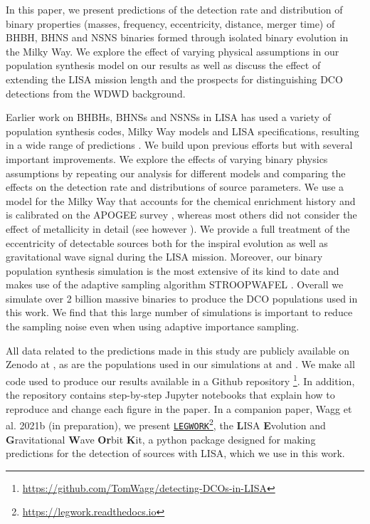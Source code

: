 In this paper, we present predictions of the detection rate and distribution of binary properties (masses, frequency, eccentricity, distance, merger time) of BHBH, BHNS and NSNS binaries formed through isolated binary evolution in the Milky Way. We explore the effect of varying physical assumptions in our population synthesis model on our results as well as discuss the effect of extending the LISA mission length and the prospects for distinguishing DCO detections from the WDWD background.

Earlier work on BHBHs, BHNSs and NSNSs in LISA has used a variety of population synthesis codes, Milky Way models and LISA specifications, resulting in a wide range of predictions \citep{Nelemans+2001,Liu+2009,Belczynski+2010,Liu+2014,Lamberts+2019,Lau+2020,Breivik+2020,Sesana+2020}. We build upon previous efforts but with several important improvements. We explore the effects of varying binary physics assumptions by repeating our analysis for \nModels{} different models and comparing the effects on the detection rate and distributions of source parameters. We use a model for the Milky Way that accounts for the chemical enrichment history and is calibrated on the APOGEE survey \citep{Majewski+2017,Frankel+2018}, whereas most others did not consider the effect of metallicity in detail (see however \citealp{Lamberts+2019, Sesana+2020}). We provide a full treatment of the eccentricity of detectable sources both for the inspiral evolution as well as gravitational wave signal during the LISA mission. Moreover, our binary population synthesis simulation is the most extensive of its kind to date and makes use of the adaptive sampling algorithm STROOPWAFEL \citep{Broekgaarden+2019, Broekgaarden+2021}. Overall we simulate over 2 billion massive binaries to produce the DCO populations used in this work. We find that this large number of simulations is important to reduce the sampling noise even when using adaptive importance sampling.

All data related to the predictions made in this study are publicly available on Zenodo at \citet{Wagg+2021_zenodo}, as are the populations used in our simulations at \citet[][BHBH]{Broekgaarden:2021-zenodo-BHBH} \citet[][BHNS]{Broekgaarden:2021-zenodo-BHNS} and  \citet[][NSNS]{Broekgaarden:2021-zenodo-NSNS}. We make all code used to produce our results available in a Github repository \href{https://github.com/TomWagg/detecting-DCOs-in-LISA}{\faGithub}\footnote{\url{https://github.com/TomWagg/detecting-DCOs-in-LISA}}. In addition, the repository contains step-by-step Jupyter notebooks that explain how to reproduce and change each figure in the paper. In a companion paper, Wagg et al. 2021b (in preparation), we present \href{https://legwork.readthedocs.io}{\texttt{LEGWORK}}\footnote{\url{https://legwork.readthedocs.io}}, the \textbf{L}ISA \textbf{E}volution and \textbf{G}ravitational \textbf{W}ave \textbf{Or}bit \textbf{K}it, a python package designed for making predictions for the detection of sources with LISA, which we use in this work.

